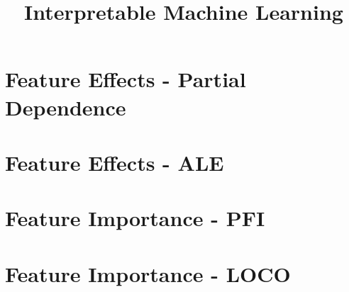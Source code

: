\documentclass[11pt,compress,t,notes=noshow, aspectratio=169, xcolor=table]{beamer}
\title{Interpretable Machine Learning}
\date{}
\begin{document}

% 

% 


\section{Feature Effects - Partial Dependence}


%


\section{Feature Effects - ALE}
%






\section{Feature Importance - PFI}






%


\section{Feature Importance - LOCO}

\end{document}
